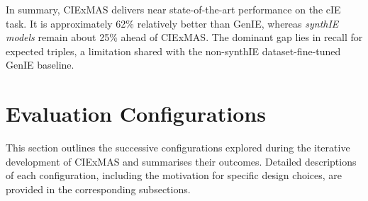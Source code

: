 \documentclass[a4paper,oneside,bibliography=totoc]{scrbook}
\begin{document}
In summary, CIExMAS delivers near state-of-the-art performance on the \ac{cIE} task. It is approximately 62\% relatively better than GenIE, whereas \textit{synthIE models} remain about 25\% ahead of CIExMAS. The dominant gap lies in recall for expected triples, a limitation shared with the non-synthIE dataset-fine-tuned GenIE baseline.

\section{Evaluation Configurations}
\label{sec:evaluation_configurations}

This section outlines the successive configurations explored during the iterative development of CIExMAS and summarises their outcomes. Detailed descriptions of each configuration, including the motivation for specific design choices, are provided in the corresponding subsections.
\end{document}
